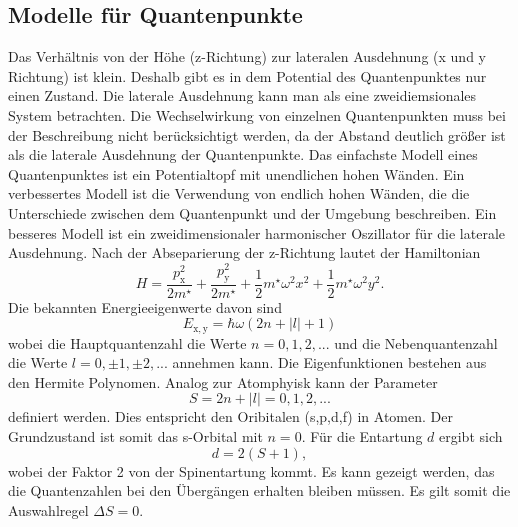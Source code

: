\subsection{Modelle für Quantenpunkte}
Das Verhältnis von der Höhe (z-Richtung) zur lateralen Ausdehnung  (x und y Richtung) ist klein. Deshalb gibt es in dem Potential des Quantenpunktes nur einen Zustand. Die laterale Ausdehnung kann man als eine zweidiemsionales System betrachten. Die Wechselwirkung von einzelnen Quantenpunkten muss bei der Beschreibung nicht berücksichtigt werden, da der Abstand deutlich größer ist als die laterale Ausdehnung der Quantenpunkte. 
Das einfachste Modell eines Quantenpunktes ist ein Potentialtopf mit unendlichen hohen Wänden. Ein verbessertes Modell ist die Verwendung von endlich hohen Wänden, die die Unterschiede zwischen dem Quantenpunkt und der Umgebung beschreiben. Ein besseres Modell ist ein zweidimensionaler harmonischer Oszillator für die laterale Ausdehnung. Nach der Abseparierung der z-Richtung lautet der Hamiltonian
\begin{equation}  
H = \frac{p_\mathrm{x}^2}{2 m^\star} + \frac{p_\mathrm{y}^2}{2 m^\star} + \frac{1}{2} m^\star \omega^2 x^2 + \frac{1}{2} m^\star \omega^2 y^2. 
\end{equation} 
Die bekannten Energieeigenwerte davon sind 
\begin{equation}
E_{\mathrm{x,y}} = \hbar \omega (2n +|l| +1)
\end{equation}
wobei die Hauptquantenzahl die Werte $n = 0,1,2, ...$ und die Nebenquantenzahl die Werte $l = 0, \pm1, \pm2, ...$ annehmen kann. 
Die Eigenfunktionen bestehen aus den Hermite Polynomen. Analog zur Atomphyisk kann der Parameter 
\begin{equation}
S = 2n +|l| = 0,1,2, ...
\end{equation}
definiert werden. Dies entspricht den Oribitalen (s,p,d,f) in Atomen. 
Der Grundzustand ist somit das s-Orbital mit $n = 0$. 
Für die Entartung $d$ ergibt sich 
\begin{equation}
d = 2(S+1),
\end{equation}
wobei der Faktor 2 von der Spinentartung kommt. Es kann gezeigt werden, das die Quantenzahlen bei den Übergängen erhalten bleiben müssen.  Es gilt somit die Auswahlregel $\Delta S =0$. 

